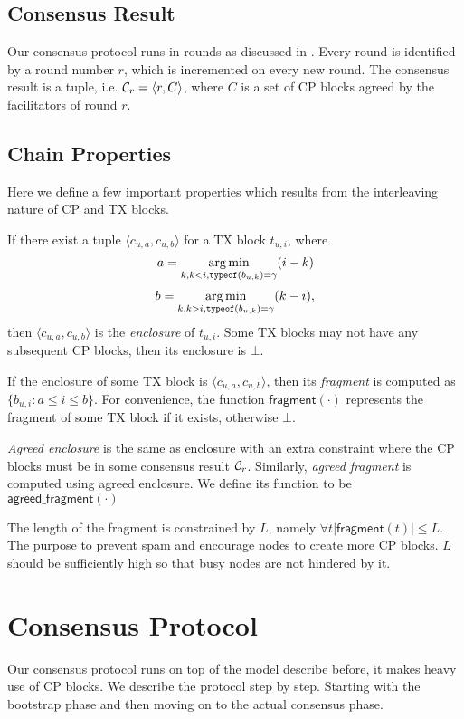 \subsection{Consensus Result}
Our consensus protocol runs in rounds as discussed in .
Every round is identified by a round number $r$, which is incremented on every new round.
The consensus result is a tuple, i.e. $\mathcal{C}_r = \langle r, C \rangle$,
where $C$ is a set of CP blocks agreed by the facilitators of round $r$.

\subsection{Chain Properties}
Here we define a few important properties which results from the interleaving nature of CP and TX blocks.

If there exist a tuple $\langle c_{u,a}, c_{u, b} \rangle$ for a TX block $t_{u, i}$,
where 
$$a = \operatorname*{arg\,min}_{k, k < i, \texttt{typeof}(b_{u,k}) = \gamma}(i - k)$$
$$b = \operatorname*{arg\,min}_{k, k > i, \texttt{typeof}(b_{u,k}) = \gamma}(k - i),$$
then $\langle c_{u,a}, c_{u, b} \rangle$ is the \emph{enclosure} of $t_{u, i}$.
Some TX blocks may not have any subsequent CP blocks, then its enclosure is $\bot$.

If the enclosure of some TX block is $\langle c_{u,a}, c_{u, b} \rangle$,
then its \emph{fragment} is computed as $\{ b_{u, i} : a \le i \le b \}$.
For convenience, the function $\textsf{fragment}(\cdot)$ represents the fragment of some TX block if it exists, otherwise $\bot$.

\emph{Agreed enclosure} is the same as enclosure with an extra constraint where the CP blocks must be in some consensus result $\mathcal{C}_r$.
Similarly, \emph{agreed fragment} is computed using agreed enclosure.
We define its function to be $\textsf{agreed\_fragment}(\cdot)$

The length of the fragment is constrained by $L$,
namely $\forall t |\textsf{fragment}(t)| \le L$.
The purpose to prevent spam and encourage nodes to create more CP blocks.
$L$ should be sufficiently high so that busy nodes are not hindered by it.

\section{Consensus Protocol}
\label{sec:cons-protocol}

Our consensus protocol runs on top of the model describe before, it makes heavy use of CP blocks.
We describe the protocol step by step.
Starting with the bootstrap phase and then moving on to the actual consensus phase.

